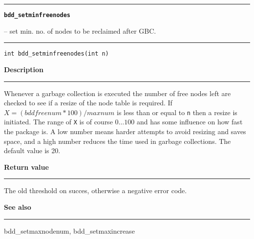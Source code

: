 \begin{minipage}{\textwidth}

\noindent\begin{minipage}{\textwidth}
\rule{\textwidth}{0.5mm}
{\tt\bf bdd\_setminfreenodes }
\--- set min. no. of nodes to be reclaimed after GBC.  \hspace{\fill}
\\\rule[1.5ex]{\textwidth}{0.5mm}
\end{minipage}

\noindent\begin{verbatim}
int bdd_setminfreenodes(int n) 
\end{verbatim}

\vspace{\parsep}\noindent
{\bf Description}\\\rule[1.5ex]{\textwidth}{0.2mm}\vspace{-1.5ex}\setlength{\parindent}{1em}
Whenever a garbage collection is executed the number of free
           nodes left are checked to see if a resize of the node table is
	   required. If $X = (\mathit{bddfreenum}*100)/\mathit{maxnum}$
	   is less than or
	   equal to {\tt n} then a resize is initiated. The range of
	   {\tt X} is of course $0\ldots 100$ and has some influence
	   on how fast the package is. A low number means harder attempts
	   to avoid resizing and saves space, and a high number reduces
	   the time used in garbage collections. The default value is
	   20. 

\setlength{\parindent}{0em}\vspace{\parsep}\vspace{\baselineskip}\noindent
{\bf Return value}\\\rule[1.5ex]{\textwidth}{0.2mm}\vspace{-1.5ex}
The old threshold on succes, otherwise a negative error code. 

\vspace{\parsep}\vspace{\baselineskip}\noindent
{\bf See also}\\\rule[1.5ex]{\textwidth}{0.2mm}\vspace{-1.5ex}
bdd\_setmaxnodenum, bdd\_setmaxincrease 
\end{minipage}
\vspace{8ex}
